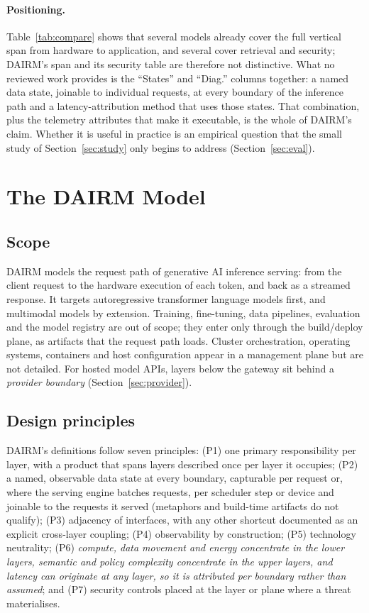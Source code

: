 \documentclass[11pt]{article}
\begin{document}
\paragraph{Positioning.} Table~\ref{tab:compare} shows that several models already cover the full vertical span from hardware to application, and several cover retrieval and security; DAIRM's span and its security table are therefore not distinctive. What no reviewed work provides is the ``States'' and ``Diag.'' columns together: a named data state, joinable to individual requests, at every boundary of the inference path and a latency-attribution method that uses those states. That combination, plus the telemetry attributes that make it executable, is the whole of DAIRM's claim. Whether it is useful in practice is an empirical question that the small study of Section~\ref{sec:study} only begins to address (Section~\ref{sec:eval}).

\section{The DAIRM Model}
\label{sec:model}

\subsection{Scope}
\label{sec:scope}
DAIRM models the request path of generative AI inference serving: from the client request to the hardware execution of each token, and back as a streamed response. It targets autoregressive transformer language models first, and multimodal models by extension. Training, fine-tuning, data pipelines, evaluation and the model registry are out of scope; they enter only through the build/deploy plane, as artifacts that the request path loads. Cluster orchestration, operating systems, containers and host configuration appear in a management plane but are not detailed. For hosted model APIs, layers below the gateway sit behind a \emph{provider boundary} (Section~\ref{sec:provider}).

\subsection{Design principles}
DAIRM's definitions follow seven principles: (P1) one primary responsibility per layer, with a product that spans layers described once per layer it occupies; (P2) a named, observable data state at every boundary, capturable per request or, where the serving engine batches requests, per scheduler step or device and joinable to the requests it served (metaphors and build-time artifacts do not qualify); (P3) adjacency of interfaces, with any other shortcut documented as an explicit cross-layer coupling; (P4) observability by construction; (P5) technology neutrality; (P6) \emph{compute, data movement and energy concentrate in the lower layers, semantic and policy complexity concentrate in the upper layers, and latency can originate at any layer, so it is attributed per boundary rather than assumed}; and (P7) security controls placed at the layer or plane where a threat materialises.
\end{document}

